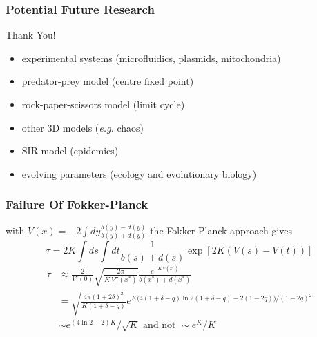 \documentclass[dvipsnames]{beamer}
\begin{document}
\begin{frame}
\frametitle{Potential Future Research}
\begin{center}
	{{\Huge Thank You!}}
\end{center}
\vspace{-0.3cm}
\Large{
	\begin{itemize}
		\item experimental systems (microfluidics, plasmids, mitochondria)
		\item predator-prey model (centre fixed point)
		\item rock-paper-scissors model (limit cycle)
		\item other 3D models (\emph{e.g.} chaos)
		\item SIR model (epidemics)
		\item evolving parameters (ecology and evolutionary biology)
	\end{itemize}
}
\end{frame}


\begin{frame}
\frametitle{Failure Of Fokker-Planck}
\pause
\small{
with $V(x) = -2\int dy \frac{b(y)-d(y)}{b(y)+d(y)}$ the Fokker-Planck approach gives
\begin{equation*}
\tau = 2K \int ds \int dt \frac{1}{b(s)+d(s)} \exp\left[2K \left( V(s)-V(t) \right)\right]
\end{equation*}
\pause
\begin{align*}
\tau &\approx \frac{2}{V'(0)}\sqrt{\frac{2\pi}{K\,V''(x^*)}}\frac{e^{-K\,V(x^*)}}{b(x^*)+d(x^*)} \\
     &= \sqrt{\frac{4\pi(1+2\delta)^2}{K(1+\delta-q)}} e^{ K\big( 4(1+\delta-q)\ln 2(1+\delta-q) - 2(1-2q) \big)/(1-2q)^2 } \\ %
     &\sim e^{(4\ln 2-2)K}/\sqrt{K} \text{ and not } \sim e^K/K
\end{align*}
}
\end{frame}
\end{document}

